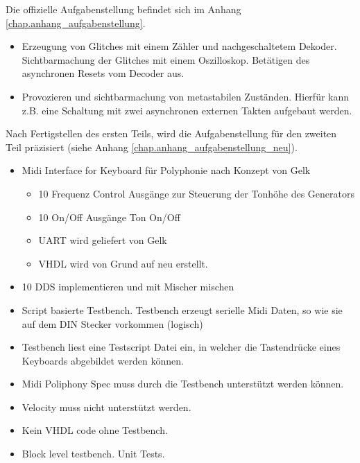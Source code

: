 Die offizielle Aufgabenstellung befindet sich im Anhang \ref{chap.anhang_aufgabenstellung}. 
 
\begin{itemize}
	\item Erzeugung von Glitches mit einem Zähler und nachgeschaltetem Dekoder. Sichtbarmachung der Glitches mit einem Oszilloskop. Betätigen des asynchronen Resets vom Decoder aus.

	\item Provozieren und sichtbarmachung von metastabilen Zuständen. Hierfür kann z.B. eine Schaltung mit zwei asynchronen externen Takten aufgebaut werden.
\end{itemize}  


Nach Fertigstellen des ersten Teils, wird die Aufgabenstellung für den zweiten Teil präzisiert (siehe Anhang \ref{chap.anhang_aufgabenstellung_neu}).

\begin{itemize}
\item Midi Interface for Keyboard für Polyphonie nach Konzept von Gelk
\begin{itemize}
    \item 10 Frequenz Control Ausgänge zur Steuerung der Tonhöhe des Generators
    \item 10 On/Off Ausgänge Ton On/Off
    \item UART wird geliefert von Gelk
    \item VHDL wird von Grund auf neu erstellt.
\end{itemize}
\item 10 DDS implementieren und mit Mischer mischen
\item Script basierte Testbench. Testbench erzeugt serielle Midi Daten, so wie sie auf dem DIN Stecker vorkommen (logisch)
\item Testbench liest eine Testscript Datei ein, in welcher die Tastendrücke eines Keyboards abgebildet werden können. 
\item Midi Poliphony Spec muss durch die Testbench unterstützt werden können. 
\item Velocity muss nicht unterstützt werden.
\item Kein VHDL code ohne Testbench.
\item Block level testbench. Unit Tests.
\end{itemize}
